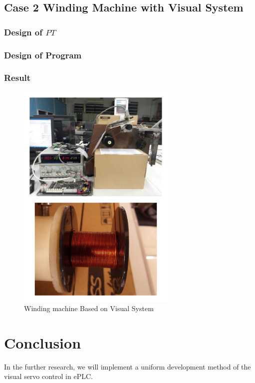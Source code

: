 \documentclass[journal,UTF8]{IEEEtran}
\begin{document}
\subsection{Case 2 Winding Machine with Visual System}

\subsubsection{Design of $PT$}

\subsubsection{Design of Program}

\subsubsection{Result}
\begin{figure}
	\centering
	\includegraphics[width=3in]{fig/Winding.pdf}
	\caption{ Winding machine Based on Visual System}
	\label{fig:Winding}
\end{figure}
\section{Conclusion}
\label{conclusion}

In the further research, we will implement a uniform development method of the visual servo control in ePLC.

\ifCLASSOPTIONcaptionsoff
  \newpage
\fi
\end{document}
